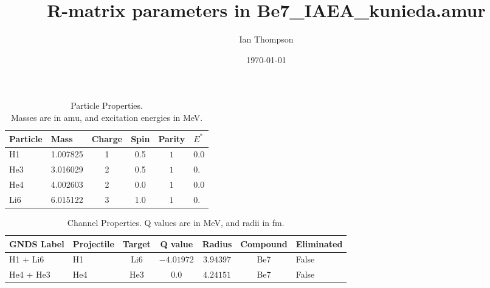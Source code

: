 \documentclass[aps]{revtex4}
\begin{document}
\title{ R-matrix parameters in Be7\_IAEA\_kunieda.amur }
\author{Ian Thompson} 
\date{ \today }
\maketitle
         
\begin{table}[h] 
\caption{ Particle Properties. \\ Masses are in amu, and excitation energies in MeV. } 
\begin{tabular}{| llcc c l |} 
\hline\hline 
Particle & Mass & Charge & Spin & Parity & $E^*$  \\ 
\hline 
 H1 & 1.007825 & 1 & 0.5 & $1$ & $0.0$ \\ 
 He3 & 3.016029 & 2 & 0.5 & $1$ & $0.$ \\ 
 He4 & 4.002603 & 2 & 0.0 & $1$ & $0.0$ \\ 
 Li6 & 6.015122 & 3 & 1.0 & $1$ & $0.$ \\ 
\hline
 \end{tabular}
 \end{table}

 
\begin{table}[h] 
\caption{ Channel Properties. Q values are in MeV, and radii in fm.} 
\begin{tabular}{| llccc c l |} 
\hline\hline 
GNDS Label   & Projectile & Target & Q value  & Radius & Compound & Eliminated  \\ 
\hline 
 H1 + Li6 & H1 & Li6 & $-4.01972$ & $3.94397$ & Be7 & False \\ 
 He4 + He3 & He4 & He3 & $0.0$ & $4.24151$ & Be7 & False \\ 
\hline
 \end{tabular}
 \end{table}
\end{document}
